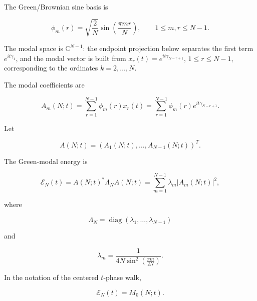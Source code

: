 \documentclass[11pt]{amsart}
\numberwithin{equation}{section}
\theoremstyle{plain}
\theoremstyle{definition}
\theoremstyle{remark}
\begin{document}
The Green/Brownian sine basis is

\begin{equation}
\phi_m(r)
=
\sqrt{\frac2N}
\sin\left(\frac{\pi m r}{N}\right),
\qquad
1\le m,r\le N-1.
\label{eq:form_factor_sine_basis}
\end{equation}

The modal space is \(\mathbb C^{N-1}\): the endpoint projection below
separates the first term \(e^{it\gamma_1}\), and the modal vector is built
from \(x_r(t)=e^{it\gamma_{N-r+1}}\), \(1\le r\le N-1\), corresponding to
the ordinates \(k=2,\ldots,N\).

The modal coefficients are

\begin{equation}
A_m(N;t)
=
\sum_{r=1}^{N-1}
\phi_m(r)x_r(t)
=
\sum_{r=1}^{N-1}
\phi_m(r)e^{it\gamma_{N-r+1}}.
\label{eq:form_factor_modal_coefficients}
\end{equation}

Let

\begin{equation}
A(N;t)
=
(A_1(N;t),\ldots,A_{N-1}(N;t))^T.
\label{eq:green_modal_vector_A}
\end{equation}

The Green-modal energy is

\begin{equation}
\mathcal E_N(t)
=
A(N;t)^*\Lambda_NA(N;t)
=
\sum_{m=1}^{N-1}
\lambda_m|A_m(N;t)|^2,
\label{eq:green_modal_energy_EN}
\end{equation}

where

\begin{equation}
\Lambda_N=\operatorname{diag}(\lambda_1,\ldots,\lambda_{N-1})
\label{eq:green_modal_lambda_matrix}
\end{equation}

and

\begin{equation}
\lambda_m
=
\frac{1}{4N\sin^2\left(\frac{\pi m}{2N}\right)}.
\label{eq:form_factor_green_eigenvalues}
\end{equation}

In the notation of the centered \(t\)-phase walk,

\begin{equation}
\mathcal E_N(t)=M_0(N;t).
\label{eq:green_modal_energy_equals_M0}
\end{equation}
\end{document}
